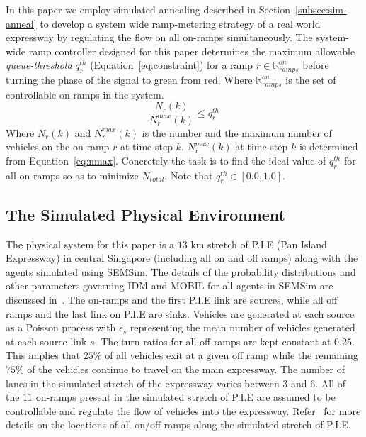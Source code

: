 \documentclass{wscpaperproc}
\theoremstyle{wsc}
\begin{document}
In this paper we employ simulated annealing described in Section~\ref{subsec:sim-anneal} to develop a system wide ramp-metering strategy of a real world expressway by regulating the flow on all on-ramps simultaneously. The system-wide ramp controller designed for this paper determines the maximum allowable {\it queue-threshold} $q^{th}_r$ (Equation~\ref{eq:constraint}) for a ramp $r\in \mathbb{R}^{on}_{ramps}$ before turning the phase of the signal to green from red. Where $\mathbb{R}^{on}_{ramps}$ is the set of controllable on-ramps in the system.
\begin{equation}
 \label{eq:constraint}
\frac{N_r(k)}{N^{max}_r(k)}\le q^{th}_r
 \end{equation}
 Where $N_r(k)$ and $N^{max}_r(k)$ is the number and the maximum number of vehicles on the on-ramp $r$ at time step $k$. $N^{max}_r(k)$ at time-step $k$ is determined from Equation~\ref{eq:nmax}. Concretely the task is to find the ideal value of $q^{th}_r$ for all on-ramps so as to minimize $N_{total}$. Note that $q^{th}_r \in [0.0,1.0]$.
 
 \subsection{The Simulated Physical Environment}
 \label{subsec:pie}
 
 The physical system for this paper is a $13$ km stretch of P.I.E (Pan Island Expressway) in central Singapore (including all on and off ramps) along with the agents simulated using SEMSim.  The details of the probability distributions and other parameters governing IDM and MOBIL for all agents in SEMSim are discussed in~. The on-ramps and the first P.I.E link are sources, while all off ramps and the last link on P.I.E are sinks. Vehicles are generated at each source as a Poisson process with $\epsilon_{s}$ representing the mean number of vehicles generated at each source link $s$. The turn ratios for all off-ramps are kept constant at $0.25$. This implies that $25\%$ of all vehicles exit at a given off ramp while the remaining $75\%$ of the vehicles continue to travel on the main expressway. The number of lanes in the simulated stretch of the expressway varies between $3$ and $6$. All of the $11$ on-ramps present in the simulated stretch of P.I.E are assumed to be controllable and regulate the flow of vehicles into the expressway. Refer~ for more details on the locations of all on/off ramps along the simulated stretch of P.I.E.
\end{document}

